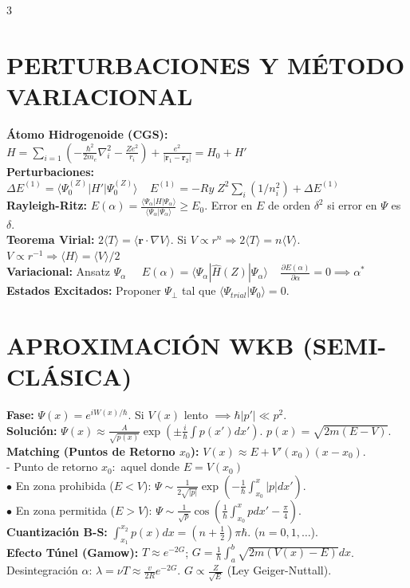 \documentclass[8pt,a4paper,fleqn]{extarticle} %
\begin{document}
\begin{multicols}{3}
\section{PERTURBACIONES Y MÉTODO VARIACIONAL }
\textbf{Átomo Hidrogenoide (CGS):} $H = \sum_{i=1} \left( -\frac{\hbar^2}{2m_e}\nabla_i^2 - \frac{Z e^2}{r_i} \right) + \frac{e^2}{|\mathbf{r}_1 - \mathbf{r}_2|} =  H_0 + H'$\\
\textbf{Perturbaciones:} $\Delta E^{(1)} = \langle \Psi_0^{(Z)} | H' | \Psi_0^{(Z)} \rangle \;\;\;\; E^{(1)} = -Ry\; Z^2 \sum_i(1/n_i^2) + \Delta E^{(1)}$  \\
\textbf{Rayleigh-Ritz:} $E(\alpha) = \frac{\langle \Psi_\alpha | H | \Psi_\alpha \rangle}{\langle \Psi_\alpha | \Psi_\alpha \rangle} \ge E_0$. Error en $E$ de orden $\delta^2$ si error en $\Psi$ es $\delta$.\\
\textbf{Teorema Virial:} $2\langle T \rangle = \langle \mathbf{r} \cdot \nabla V \rangle$. Si $V \propto r^n \Rightarrow 2\langle T \rangle = n \langle V \rangle$.
$V\propto r^{-1} \Rightarrow \langle H\rangle = \langle V\rangle/2$\\
\textbf{Variacional:} Ansatz $\Psi_\alpha \;\;\;\;\;  E(\alpha) = \langle \Psi_\alpha | \hat{H}(Z) | \Psi_\alpha \rangle\;\;\;\;     \frac{\partial E(\alpha)}{\partial \alpha} = 0 \implies \alpha^*$ \\
\textbf{Estados Excitados:} Proponer $\Psi_\perp$ tal que $\langle \Psi_{trial} | \Psi_0 \rangle = 0$.
\section{APROXIMACIÓN WKB (SEMI-CLÁSICA)}
\textbf{Fase:} $\Psi(x) = e^{iW(x)/\hbar}$. Si $V(x)$ lento $\implies \hbar |p'| \ll p^2$.\\
\textbf{Solución:} $\Psi(x) \approx \frac{A}{\sqrt{p(x)}} \exp(\pm \frac{i}{\hbar} \int p(x') dx')$. $p(x) = \sqrt{2m(E-V)}$.\\
\textbf{Matching (Puntos de Retorno $x_0$):} $V(x) \approx E + V'(x_0)(x-x_0)$.\\
- Punto de retorno $x_0:$ aquel donde $E= V(x_0)$\\
$\bullet$ En zona prohibida ($E < V$): $\Psi \sim \frac{1}{2\sqrt{|p|}} \exp(-\frac{1}{\hbar} \int_{x_0}^x |p| dx')$.\\
$\bullet$ En zona permitida ($E > V$): $\Psi \sim \frac{1}{\sqrt{p}} \cos(\frac{1}{\hbar} \int_{x_0}^x p dx' - \frac{\pi}{4})$.\\
\textbf{Cuantización B-S:} $\int_{x_1}^{x_2} p(x) dx = (n + \frac{1}{2})\pi\hbar$. ($n=0, 1, \dots$).\\
\textbf{Efecto Túnel (Gamow):} $T \approx e^{-2G}$; $G = \frac{1}{\hbar} \int_{a}^b \sqrt{2m(V(x)-E)} dx$.\\
Desintegración $\alpha$: $\lambda = \nu T \approx \frac{v}{2R} e^{-2G}$. $G \propto \frac{Z}{\sqrt{E}}$ (Ley Geiger-Nuttall).


\end{multicols}
\end{document}

